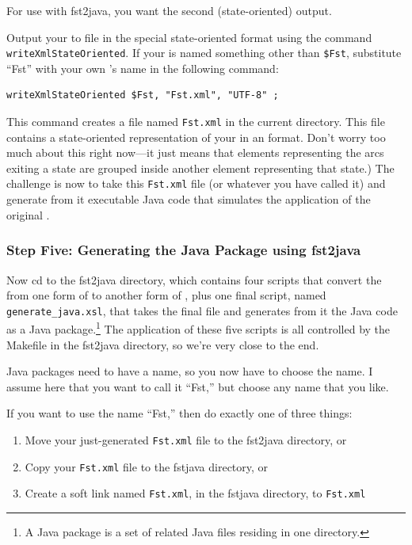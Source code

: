 \noindent
For use with fst2java, you want the second (state-oriented) output.

Output your \fsm{} to file in the special state-oriented \xml{} format
using the command \texttt{writeXmlStateOriented}.  If your \fsm{} is named
something other than \verb!$Fst!, substitute ``Fst'' with your own \fsm{}'s name in
the following command:

\begin{Verbatim}
writeXmlStateOriented $Fst, "Fst.xml", "UTF-8" ;
\end{Verbatim}

\noindent
This command creates a file named \texttt{Fst.xml} in the current directory.
This file contains a state-oriented representation of your \fsm{} in an
\xml{} format.  Don't worry too much about this right now---it just means that \xml{} elements
representing the arcs exiting a state are grouped inside another \xml{} element
representing that state.) The challenge is now to take this \texttt{Fst.xml}
file (or whatever you have called it) and generate from it executable
Java code that simulates the application of the original \fsm{}.

\subsubsection{Step Five:  Generating the Java Package using fst2java}

Now cd to the fst2java directory, which contains four \xslt{} scripts that
convert the \fsm{} from one form of \xml{} to another form of \xml{}, plus one
final \xslt{} script, named \texttt{generate\_java.xsl}, that takes the final \xml{}
file and generates from it the Java code as a Java package.\footnote{A Java package is a set of related Java files residing in
one directory.}  The
application of these five \xslt{} scripts is all controlled by the Makefile
in the fst2java directory, so we're very close to the end.

Java packages need to have a name, so you now have to
choose the name.  I assume
here that you want to call it ``Fst,'' but choose any name that you like.

If you want to use the name ``Fst,'' then do exactly one of three things:

\begin{enumerate}
\item
Move your just-generated \texttt{Fst.xml} file to the fst2java directory, or
\item
Copy your \texttt{Fst.xml} file to the fstjava directory, or
\item
Create a soft link named \texttt{Fst.xml}, in the fstjava directory, to \texttt{Fst.xml}
\end{enumerate}

